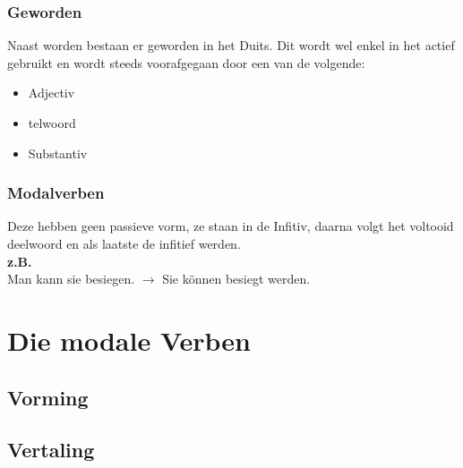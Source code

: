 \documentclass[main.tex]{subfiles}
\begin{document}
\subsubsection{Geworden}
Naast worden bestaan er geworden in het Duits. Dit wordt wel enkel in het actief gebruikt en wordt steeds voorafgegaan door een van de volgende:
\begin{itemize}
\item Adjectiv
\item telwoord
\item Substantiv
\end{itemize}
\subsubsection{Modalverben}
Deze hebben geen passieve vorm, ze staan in de Infitiv, daarna volgt het voltooid deelwoord en als laatste de infitief werden.\\
\textbf{z.B.}\\
Man kann sie besiegen. $\rightarrow$ Sie können besiegt werden.
\section{Die modale Verben}
\subsection{Vorming}

\subsection{Vertaling}
\end{document}

